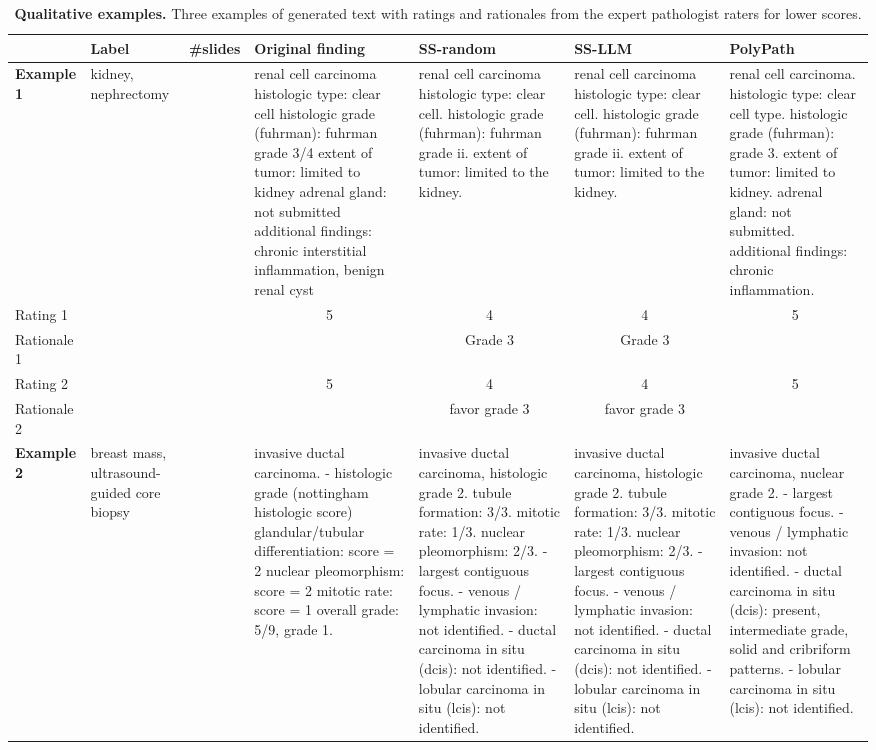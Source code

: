 \documentclass[11pt]{article}
\begin{document}
\begin{table}[h]
\caption{\small \textbf{Qualitative examples.} Three examples of generated text with ratings and rationales from the expert pathologist raters for lower scores.}
\scriptsize
\centering
\begin{tabular}{l p{1cm} >{\centering\arraybackslash}p{1cm} p{2.5cm} p{2.5cm} p{2.5cm} p{2.5cm}}
\toprule
 & \textbf{Label} & \textbf{\#slides} & \textbf{Original finding} & \textbf{SS-random} & \textbf{SS-LLM} & \textbf{PolyPath} \\
\midrule
\textbf{Example 1} & kidney, nephrectomy & 6 & renal cell carcinoma histologic type: clear cell histologic grade (fuhrman): fuhrman grade 3/4 extent of tumor: limited to kidney adrenal gland: not submitted additional findings: chronic interstitial inflammation, benign renal cyst & renal cell carcinoma histologic type: clear cell. histologic grade (fuhrman): fuhrman grade ii. extent of tumor: limited to the kidney. & renal cell carcinoma histologic type: clear cell. histologic grade (fuhrman): fuhrman grade ii. extent of tumor: limited to the kidney. & renal cell carcinoma. histologic type: clear cell type. histologic grade (fuhrman): grade 3. extent of tumor: limited to kidney. adrenal gland: not submitted. additional findings: chronic inflammation. \\
\hline
Rating 1 & & & \multicolumn{1}{c}{5} & \multicolumn{1}{c}{4} & \multicolumn{1}{c}{4} & \multicolumn{1}{c}{5} \\ 
Rationale 1 & & & & \multicolumn{1}{c}{Grade 3} & \multicolumn{1}{c}{Grade 3} &  \\
\hline
Rating 2 & & & \multicolumn{1}{c}{5} & \multicolumn{1}{c}{4} & \multicolumn{1}{c}{4} & \multicolumn{1}{c}{5} \\
Rationale 2 & & & & \multicolumn{1}{c}{favor grade 3} & \multicolumn{1}{c}{favor grade 3} &  \\
\midrule
\textbf{Example 2} & breast mass, ultrasound-guided core biopsy & 3 & invasive ductal carcinoma. - histologic grade (nottingham histologic score) glandular/tubular differentiation: score = 2 nuclear pleomorphism: score = 2 mitotic rate: score = 1 overall grade: 5/9, grade 1. & invasive ductal carcinoma, histologic grade 2. tubule formation: 3/3. mitotic rate: 1/3. nuclear pleomorphism: 2/3. - largest contiguous focus. - venous / lymphatic invasion: not identified. - ductal carcinoma in situ (dcis): not identified. - lobular carcinoma in situ (lcis): not identified. & invasive ductal carcinoma, histologic grade 2. tubule formation: 3/3. mitotic rate: 1/3. nuclear pleomorphism: 2/3. - largest contiguous focus. - venous / lymphatic invasion: not identified. - ductal carcinoma in situ (dcis): not identified. - lobular carcinoma in situ (lcis): not identified. & invasive ductal carcinoma, nuclear grade 2. - largest contiguous focus. - venous / lymphatic invasion: not identified. - ductal carcinoma in situ (dcis): present, intermediate grade, solid and cribriform patterns. - lobular carcinoma in situ (lcis): not identified. \\

\end{tabular}
\end{table}
\end{document}

